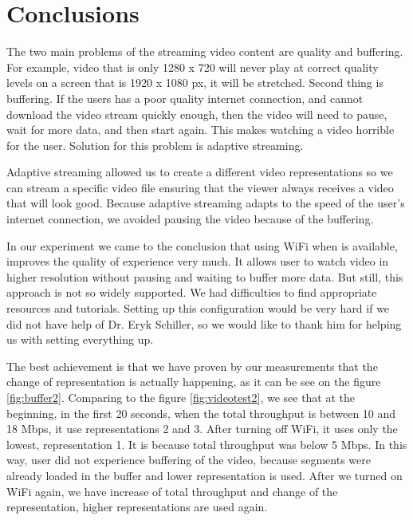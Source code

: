 \documentclass{llncs}
\begin{document}
\newpage
\section{Conclusions}
The two main problems of the streaming video content are quality and buffering. For example, video that is only 1280 x 720 will never play at correct quality levels on a screen that is 1920 x 1080 px, it will be stretched. Second thing is  buffering. If the users has a poor quality internet connection, and cannot download the video stream quickly enough, then the video will need to pause, wait for more data, and then start again. This makes watching a video horrible for the user. Solution for this problem is adaptive streaming. 

Adaptive streaming allowed us to create a different video representations so we can stream a specific video file ensuring that the viewer always receives a video that will look good. Because adaptive streaming adapts to the speed of the user’s internet connection, we avoided pausing the video because of the buffering.

In our experiment we came to the conclusion that using WiFi when is available, improves the quality of experience very much. It allows user to watch video in higher resolution without pausing and waiting to buffer more data. But still, this approach is not so widely supported. We had difficulties to find appropriate resources and tutorials. Setting up this configuration would be very hard if we did not have help of Dr. Eryk Schiller, so we would like to thank him for helping us with setting everything up. 

The best achievement is that we have proven by our measurements that  the change of representation is actually happening, as it can be see on the figure \ref{fig:buffer2}. Comparing to the figure \ref{fig:videotest2}, we see that at the beginning, in the first 20 seconds, when the total throughput is between 10 and 18 Mbps, it use representations 2 and 3. After turning off WiFi, it uses only the lowest, representation 1. It is because total throughput was below 5 Mbps. In this way, user did not experience buffering of the video, because segments were already loaded in the buffer and lower representation is used. After we turned on WiFi again, we have increase of total throughput and change of the representation, higher representations are used again. 
\end{document}
